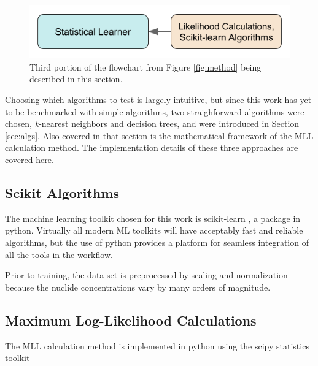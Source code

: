 
\begin{figure}[H]
  \centering
  \includegraphics[width=0.7\linewidth]{./chapters/exp1/methodology3.png}
  \caption{Third portion of the flowchart from Figure \ref{fig:method} being 
           described in this section.}
\end{figure}

Choosing which algorithms to test is largely intuitive, but since this work has
yet to be benchmarked with simple algorithms, two straighforward algorithms
were chosen, \textit{k}-nearest neighbors and decision trees, and were
introduced in Section \ref{sec:algs}. Also covered in that section is the
mathematical framework of the \gls{MLL} calculation method. The implementation
details of these three approaches are covered here. 

\subsection{Scikit Algorithms}
\label{sec:scikit}

The machine learning toolkit chosen for this work is scikit-learn
\cite{scikit}, a package in python.  Virtually all modern \gls{ML} toolkits
will have acceptably fast and reliable algorithms, but the use of python
provides a platform for seamless integration of all the tools in the workflow. 

Prior to training, the data set is preprocessed by scaling and normalization
because the nuclide concentrations vary by many orders of magnitude. 

\subsection{Maximum Log-Likelihood Calculations}
\label{sec:mll}

The \gls{MLL} calculation method is implemented in python using the scipy 
statistics toolkit \cite{scipy}

